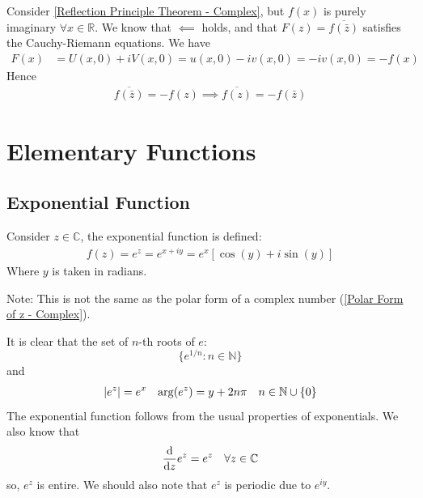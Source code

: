\documentclass[12pt, english]{book}
\begin{document}
	\begin{example}
		\label{Reflection Principle f(x) purely imaginary Example - Complex}
		{\color{Grey}
		Consider \cref{Reflection Principle Theorem - Complex}, but \(f(x)\) is purely imaginary \(\forall x \in \mathbb{R}\). We know that \(\impliedby\) holds, and that \(F(z) = \overline{f(\bar{z})}\) satisfies the Cauchy-Riemann equations. We have 
		\begin{align*}
			F(x) &= U(x,0) + iV(x,0) = u(x,0) - iv(x,0) = -iv(x,0) = -f(x)
		\end{align*}
		Hence
		\begin{align*}
			\overline{f(\bar{z})} = -f(z) \implies \overline{f(z)} = -f(\bar{z})
		\end{align*}
		}
	\end{example}
	
	
	
	\chapter{Elementary Functions} \label{Elementary Functions Chapter - Complex}
	
	\section{Exponential Function} \label{Exponential Function Section - Complex}
	
	\begin{definition}
		\label{Exponential Function Definiton - Complex}
		Consider \(z \in \mathbb{C}\), the exponential function is defined:
		\begin{align*}
			f(z) = e^z = e^{x + iy} = e^x [\cos(y) + i\sin(y)]
		\end{align*}
		Where \(y\) is taken in radians. 
	\end{definition}
	Note: This is not the same as the polar form of a complex number (\cref{Polar Form of z - Complex}).
	
	It is clear that the set of \(n\)-th roots of \(e\):
	\[\{e^{1/n} : n \in \mathbb{N} \} \]
	and 
	\begin{align*}
		\abs{e^z} &= e^x & \arg(e^z) &= y + 2n\pi & n \in \mathbb{N}\cup \{0\}
	\end{align*}
	The exponential function follows from the usual properties of exponentials. We also know that 
	\begin{align*}
		\dv{z} e^z &= e^z & \forall z \in \mathbb{C}
	\end{align*}
	so, \(e^z\) is entire. We should also note that \(e^z\) is periodic due to \(e^{iy}\).
	
\end{document}
